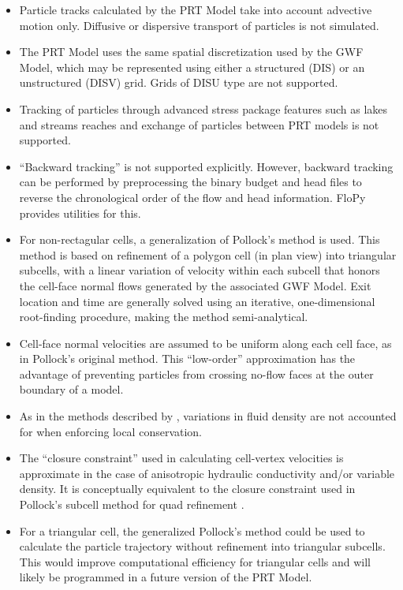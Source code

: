 \begin{itemize}
\item Particle tracks calculated by the PRT Model take into account advective motion only. Diffusive or dispersive transport of particles is not simulated.
\item The PRT Model uses the same spatial discretization used by the GWF Model, which may be represented using either a structured (DIS) or an unstructured (DISV) grid. Grids of DISU type are not supported.
\item Tracking of particles through advanced stress package features such as lakes and streams reaches and exchange of particles between PRT models is not supported.
\item ``Backward tracking'' is not supported explicitly. However, backward tracking can be performed by preprocessing the binary budget and head files to reverse the chronological order of the flow and head information. FloPy \citep{bakker2016flopy, hughes2023flopy, flopysoftware} provides utilities for this.
\item For non-rectagular cells, a generalization of Pollock's method is used. This method is based on refinement of a polygon cell (in plan view) into triangular subcells, with a linear variation of velocity within each subcell that honors the cell-face normal flows generated by the associated GWF Model. Exit location and time are generally solved using an iterative, one-dimensional root-finding procedure, making the method semi-analytical.
\item Cell-face normal velocities are assumed to be uniform along each cell face, as in Pollock's original method. This ``low-order'' approximation has the advantage of preventing particles from crossing no-flow faces at the outer boundary of a model.
\item As in the methods described by \cite{zhang2012}, variations in fluid density are not accounted for when enforcing local conservation.
\item The ``closure constraint'' used in calculating cell-vertex velocities is approximate in the case of anisotropic hydraulic conductivity and/or variable density. It is conceptually equivalent to the closure constraint used in Pollock's subcell method for quad refinement \citep{pollock2015}.
\item For a triangular cell, the generalized Pollock's method could be used to calculate the particle trajectory without refinement into triangular subcells. This would improve computational efficiency for triangular cells and will likely be programmed in a future version of the PRT Model.
\end{itemize}
